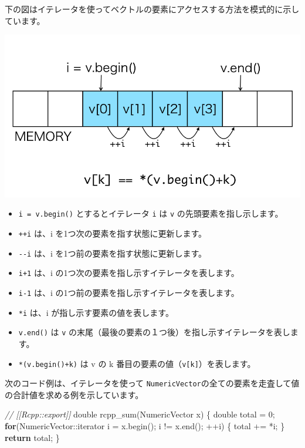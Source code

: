 \documentclass[]{book}
\newenvironment{Shaded}{\begin{snugshade}}{\end{snugshade}}
\newcommand{\CommentTok}[1]{\textcolor[rgb]{0.56,0.35,0.01}{\textit{#1}}}
\newcommand{\ControlFlowTok}[1]{\textcolor[rgb]{0.13,0.29,0.53}{\textbf{#1}}}
\newcommand{\DataTypeTok}[1]{\textcolor[rgb]{0.13,0.29,0.53}{#1}}
\newcommand{\DecValTok}[1]{\textcolor[rgb]{0.00,0.00,0.81}{#1}}
\newcommand{\NormalTok}[1]{#1}
\providecommand{\tightlist}{%
  \setlength{\itemsep}{0pt}\setlength{\parskip}{0pt}}
\begin{document}
下の図はイテレータを使ってベクトルの要素にアクセスする方法を模式的に示しています。

\includegraphics{iterator.png}

\begin{itemize}
\tightlist
\item
  \texttt{i\ =\ v.begin()} とするとイテレータ \texttt{i} は \texttt{v} の先頭要素を指し示します。
\item
  \texttt{++i} は、i を1つ次の要素を指す状態に更新します。
\item
  \texttt{-\/-i} は、i を1つ前の要素を指す状態に更新します。
\item
  \texttt{i+1} は、i の1つ次の要素を指し示すイテレータを表します。
\item
  \texttt{i-1} は、i の1つ前の要素を指し示すイテレータを表します。
\item
  \texttt{*i} は、i が指し示す要素の値を表します。
\item
  \texttt{v.end()} は \texttt{v} の末尾（最後の要素の１つ後）を指し示すイテレータを表します。
\item
  \texttt{*(v.begin()+k)} は v の k 番目の要素の値（\texttt{v{[}k{]}}）を表します。
\end{itemize}

次のコード例は、イテレータを使って \texttt{NumericVector}の全ての要素を走査して値の合計値を求める例を示しています。

\begin{Shaded}
\begin{Highlighting}[]
\CommentTok{// [[Rcpp::export]]}
\DataTypeTok{double}\NormalTok{ rcpp_sum(NumericVector x) \{}
  \DataTypeTok{double}\NormalTok{ total = }\DecValTok{0}\NormalTok{;}
  \ControlFlowTok{for}\NormalTok{(NumericVector::iterator i = x.begin(); i != x.end(); ++i) \{}
\NormalTok{    total += *i;}
\NormalTok{  \}}
  \ControlFlowTok{return}\NormalTok{ total;}
\NormalTok{\}}
\end{Highlighting}
\end{Shaded}
\end{document}
